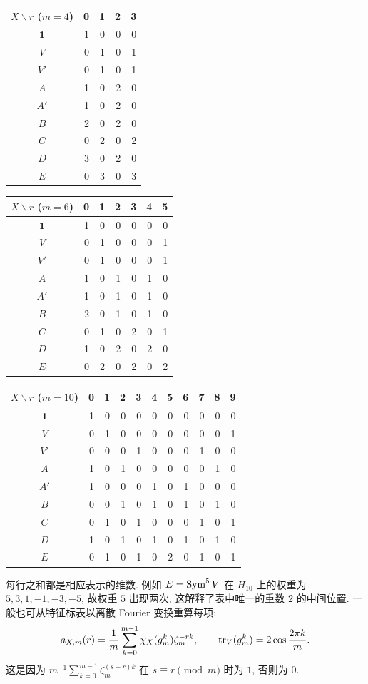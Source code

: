 \begin{solution}
\begin{center}
\begin{tabular}{c|rrrr}
\toprule
$X\backslash r$ ($m=4$)&0&1&2&3\\ \midrule
$\mathbf1$&1&0&0&0\\
$V$&0&1&0&1\\
$V'$&0&1&0&1\\
$A$&1&0&2&0\\
$A'$&1&0&2&0\\
$B$&2&0&2&0\\
$C$&0&2&0&2\\
$D$&3&0&2&0\\
$E$&0&3&0&3\\ \bottomrule
\end{tabular}
\qquad
\begin{tabular}{c|rrrrrr}
\toprule
$X\backslash r$ ($m=6$)&0&1&2&3&4&5\\ \midrule
$\mathbf1$&1&0&0&0&0&0\\
$V$&0&1&0&0&0&1\\
$V'$&0&1&0&0&0&1\\
$A$&1&0&1&0&1&0\\
$A'$&1&0&1&0&1&0\\
$B$&2&0&1&0&1&0\\
$C$&0&1&0&2&0&1\\
$D$&1&0&2&0&2&0\\
$E$&0&2&0&2&0&2\\ \bottomrule
\end{tabular}
\end{center}
\begin{center}
\begin{tabular}{c|rrrrrrrrrr}
\toprule
$X\backslash r$ ($m=10$)&0&1&2&3&4&5&6&7&8&9\\ \midrule
$\mathbf1$&1&0&0&0&0&0&0&0&0&0\\
$V$&0&1&0&0&0&0&0&0&0&1\\
$V'$&0&0&0&1&0&0&0&1&0&0\\
$A$&1&0&1&0&0&0&0&0&1&0\\
$A'$&1&0&0&0&1&0&1&0&0&0\\
$B$&0&0&1&0&1&0&1&0&1&0\\
$C$&0&1&0&1&0&0&0&1&0&1\\
$D$&1&0&1&0&1&0&1&0&1&0\\
$E$&0&1&0&1&0&2&0&1&0&1\\ \bottomrule
\end{tabular}
\end{center}
每行之和都是相应表示的维数. 例如 $E=\operatorname{Sym}^5V$ 在 $H_{10}$ 上的权重为 $5,3,1,-1,-3,-5$, 故权重 $5$ 出现两次, 这解释了表中唯一的重数 $2$ 的中间位置. 一般也可从特征标表以离散 Fourier 变换重算每项:
\[
 a_{X,m}(r)=\frac1m\sum_{k=0}^{m-1}
 \chi_X(g_m^k)\zeta_m^{-rk},\qquad
 \operatorname{tr}_V(g_m^k)=2\cos\frac{2\pi k}{m}.
\]
这是因为 $m^{-1}\sum_{k=0}^{m-1}\zeta_m^{(s-r)k}$ 在 $s\equiv r\pmod m$ 时为 $1$, 否则为 $0$.


\end{solution}
